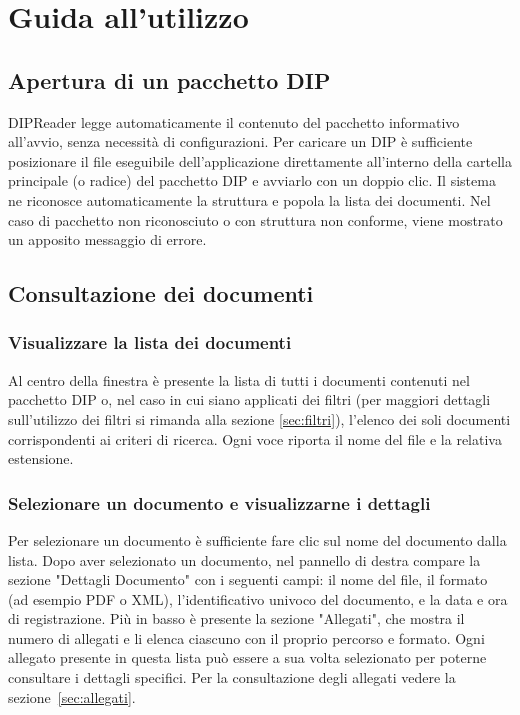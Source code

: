 \documentclass[a4paper,12pt]{article}
\begin{document}
    \section{Guida all'utilizzo}
        \subsection{Apertura di un pacchetto DIP}
        \label{sec:apertura}
        DIPReader legge automaticamente il contenuto del pacchetto informativo all'avvio, senza necessità di configurazioni. Per caricare un DIP è sufficiente posizionare il file eseguibile dell'applicazione direttamente all'interno della cartella principale (o radice) del pacchetto DIP e avviarlo con un doppio clic.
        Il sistema ne riconosce automaticamente la struttura e popola la lista dei documenti. Nel caso di pacchetto non riconosciuto o con struttura non conforme, viene mostrato un apposito messaggio di errore.

        \subsection{Consultazione dei documenti}
            \subsubsection{Visualizzare la lista dei documenti}
            Al centro della finestra è presente la lista di tutti i documenti contenuti nel pacchetto DIP o, nel caso in cui siano applicati dei filtri (per maggiori dettagli sull'utilizzo dei filtri si rimanda alla sezione \ref{sec:filtri}), l'elenco dei soli documenti corrispondenti ai criteri di ricerca. Ogni voce riporta il nome del file e la relativa estensione.          
            
            \subsubsection{Selezionare un documento e visualizzarne i dettagli}
            Per selezionare un documento è sufficiente fare clic sul nome del documento dalla lista. 
            Dopo aver selezionato un documento, nel pannello di destra compare la sezione "Dettagli Documento" con i seguenti campi: il nome del file, il formato (ad esempio PDF o XML), l'identificativo univoco del documento, e la data e ora di registrazione. Più in basso è presente la sezione "Allegati", che mostra il numero di allegati e li elenca ciascuno con il proprio percorso e formato.
            Ogni allegato presente in questa lista può essere a sua volta selezionato per poterne consultare i dettagli specifici. Per la consultazione degli allegati vedere la sezione~\ref{sec:allegati}.
\end{document}

